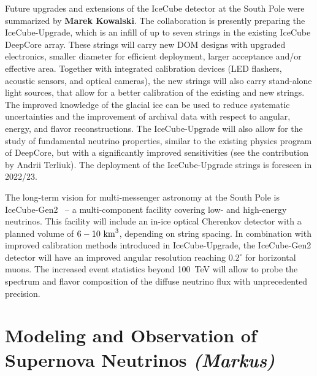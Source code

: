 \documentclass{PoS}
\begin{document}
Future upgrades and extensions of the IceCube detector at the South Pole were summarized by {\bf Marek Kowalski}. The collaboration is presently preparing the IceCube-Upgrade, which is an infill of up to seven strings in the existing IceCube DeepCore array. These strings will carry new DOM designs with upgraded electronics, smaller diameter for efficient deployment, larger acceptance and/or effective area. Together with integrated calibration devices (LED flashers, acoustic sensors, and optical cameras), the new strings will also carry stand-alone light sources, that allow for a better calibration of the existing and new strings. The improved knowledge of the glacial ice can be used to reduce systematic uncertainties and the improvement of archival data with respect to angular, energy, and flavor reconstructions. The IceCube-Upgrade will also allow for the study of fundamental neutrino properties, similar to the existing physics program of DeepCore, but with a significantly improved sensitivities (see the contribution by Andrii Terliuk). The deployment of the IceCube-Upgrade strings is foreseen in 2022/23.

The long-term vision for multi-messenger astronomy at the South Pole is IceCube-Gen2~\cite{Aartsen:2014njl} -- a multi-component facility covering low- and high-energy neutrinos. This facility will include an in-ice optical Cherenkov detector with a planned volume of $6-10~{\rm km}^3$, depending on string spacing. In combination with improved calibration methods introduced in IceCube-Upgrade, the IceCube-Gen2 detector will have an improved angular resolution reaching $0.2^\circ$ for horizontal muons. The increased event statistics beyond 100~TeV will allow to probe the spectrum and flavor composition of the diffuse neutrino flux with unprecedented precision. 

\section{Modeling and Observation of Supernova Neutrinos {\it (Markus)}}
\end{document}
